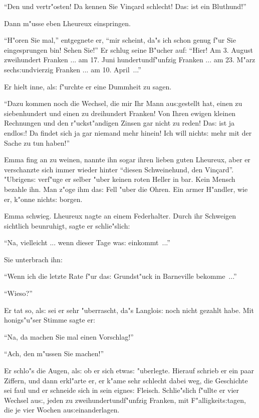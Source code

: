 \documentclass[oneside,12pt]{book}
\newcommand{\s}{s:}%
\begin{document}
"`Den und vertr"osten! Da kennen Sie Vin\c{c}ard schlecht! Da{\s}
ist ein Bluthund!"'

Dann m"usse eben Lheureux einspringen.

"`H"oren Sie mal,"' entgegnete er, "`mir scheint, da"s ich schon
genug f"ur Sie eingesprungen bin! Sehen Sie!"' Er schlug seine
B"ucher auf: "`Hier! Am 3. August zweihundert Franken ... am 17.
Juni hundertundf"unfzig Franken ... am 23. M"arz sech{\s}undvierzig
Franken ... am 10. April~..."'

Er hielt inne, al{\s} f"urchte er eine Dummheit zu sagen.

"`Dazu kommen noch die Wechsel, die mir Ihr Mann au{\s}gestellt
hat, einen zu siebenhundert und einen zu dreihundert Franken! Von
Ihren ewigen kleinen Rechnungen und den r"uckst"andigen Zinsen gar
nicht zu reden! Da{\s} ist ja endlo{\s}! Da findet sich ja gar
niemand mehr hinein! Ich will nicht{\s} mehr mit der Sache zu tun
haben!"'

Emma fing an zu weinen, nannte ihn sogar ihren lieben guten
Lheureux, aber er verschanzte sich immer wieder hinter "`diesen
Schweinehund, den Vin\c{c}ard"'. "Ubrigen{\s} verf"uge er selber
"uber keinen roten Heller in bar. Kein Mensch bezahle ihn. Man
z"oge ihm da{\s} Fell "uber die Ohren. Ein armer H"andler, wie er,
k"onne nicht{\s} borgen.

Emma schwieg. Lheureux nagte an einem Federhalter. Durch ihr
Schweigen sichtlich beunruhigt, sagte er schlie"slich:

"`Na, vielleicht ... wenn dieser Tage wa{\s} einkommt~..."'

Sie unterbrach ihn:

"`Wenn ich die letzte Rate f"ur da{\s} Grundst"uck in Barneville
bekomme~..."'

"`Wieso?"'

Er tat so, al{\s} sei er sehr "uberrascht, da"s Langloi{\s} noch
nicht gezahlt habe. Mit honigs"u"ser Stimme sagte er:

"`Na, da machen Sie mal einen Vorschlag!"'

"`Ach, den m"ussen Sie machen!"'

Er schlo"s die Augen, al{\s} ob er sich etwa{\s} "uberlegte.
Hierauf schrieb er ein paar Ziffern, und dann erkl"arte er, er
k"ame sehr schlecht dabei weg, die Geschichte sei faul und er
schneide sich in sein eigne{\s} Fleisch. Schlie"slich f"ullte er
vier Wechsel au{\s}, jeden zu zweihundertundf"unfzig Franken, mit
F"alligkeit{\s}tagen, die je vier Wochen au{\s}einanderlagen.
\end{document}

